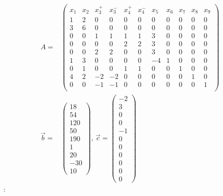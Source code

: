 \documentclass[fleqn,12pt]{scrartcl}
\begin{document}
\begin{align*}
	A =& 
	\begin{pmatrix}
		x_1 & x_2 & x_3^+ & x_3^- & x_4^+ & x_4^- & x_5 & x_6 & x_7 & x_8 & x_9\\
		1 & 2 & 0 & 0 & 0 & 0 & 0 & 0 & 0 & 0 & 0\\
		3 & 6 & 0 & 0 & 0 & 0 & 0 & 0 & 0 & 0 & 0\\
		0 & 0 & 1 & 1 & 1 & 1 & 3 & 0 & 0 & 0 & 0\\
		0 & 0 & 0 & 0 & 2 & 2 & 3 & 0 & 0 & 0 & 0\\
		0 & 0 & 2 & 2 & 0 & 0 & 3 & 0 & 0 & 0 & 0\\
		1 & 3 & 0 & 0 & 0 & 0 &-4 & 1 & 0 & 0 & 0\\
		0 & 1 & 0 & 0 & 1 & 1 & 0 & 0 & 1 & 0 & 0\\
		4 & 2 &-2 &-2 & 0 & 0 & 0 & 0 & 0 & 1 & 0\\
		0 & 0 &-1 &-1 & 0 & 0 & 0 & 0 & 0 & 0 & 1\\
	\end{pmatrix}\\
	\vec b =& 
	\begin{pmatrix}
		18 \\
		54\\
		120\\
		50\\
		190\\
		1\\
		20\\
		-30\\
		10
	\end{pmatrix}, \,
	\vec c =
	\begin{pmatrix}
		-2 \\ 3 \\ 0 \\ 0 \\ -1 \\ 0 \\ 0 \\ 0 \\ 0 \\ 0 \\ 0
	\end{pmatrix}
\end{align*}
:
\end{document}
